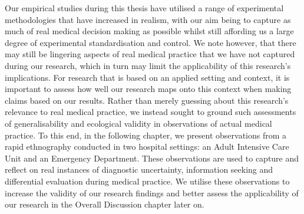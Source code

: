 \documentclass[a4paper, nobind]{templates/ociamthesis}
\begin{document}
Our empirical studies during this thesis have utilised a range of experimental methodologies that have increased in realism, with our aim being to capture as much of real medical decision making as possible whilst still affording us a large degree of experimental standardisation and control. We note however, that there may still be lingering aspects of real medical practice that we have not captured during our research, which in turn may limit the applicability of this research's implications. For research that is based on an applied setting and context, it is important to assess how well our research maps onto this context when making claims based on our results. Rather than merely guessing about this research's relevance to real medical practice, we instead sought to ground such assessments of generalisability and ecological validity in observations of actual medical practice. To this end, in the following chapter, we present observations from a rapid ethnography conducted in two hospital settings: an Adult Intensive Care Unit and an Emergency Department. These observations are used to capture and reflect on real instances of diagnostic uncertainty, information seeking and differential evaluation during medical practice. We utilise these observations to increase the validity of our research findings and better assess the applicability of our research in the Overall Discussion chapter later on.
\end{document}
